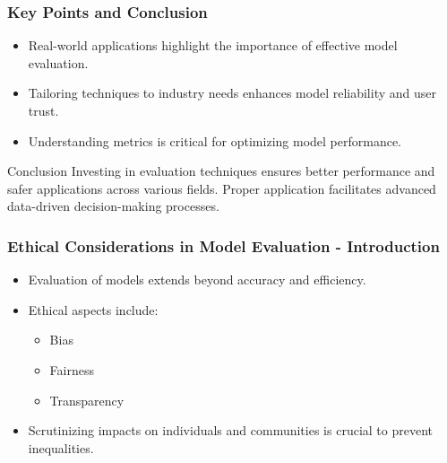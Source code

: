 \documentclass[aspectratio=169]{beamer}
\begin{document}
\begin{frame}[fragile]
    \frametitle{Key Points and Conclusion}
    \begin{itemize}
        \item Real-world applications highlight the importance of effective model evaluation.
        \item Tailoring techniques to industry needs enhances model reliability and user trust.
        \item Understanding metrics is critical for optimizing model performance.
    \end{itemize}
    \begin{block}{Conclusion}
        Investing in evaluation techniques ensures better performance and safer applications across various fields.
        Proper application facilitates advanced data-driven decision-making processes.
    \end{block}
\end{frame}

\begin{frame}[fragile]
    \frametitle{Ethical Considerations in Model Evaluation - Introduction}
    \begin{itemize}
        \item Evaluation of models extends beyond accuracy and efficiency.
        \item Ethical aspects include:
        \begin{itemize}
            \item Bias
            \item Fairness
            \item Transparency
        \end{itemize}
        \item Scrutinizing impacts on individuals and communities is crucial to prevent inequalities.
    \end{itemize}
\end{frame}
\end{document}
